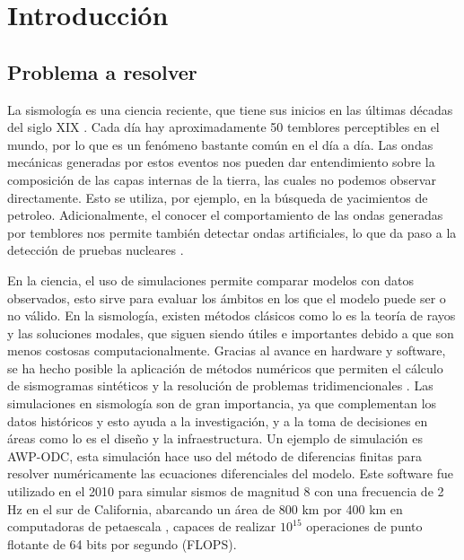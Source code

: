 \chapter{Introducción}
\section{Problema a resolver}
La sismología es una ciencia reciente, que tiene sus inicios en las últimas décadas del siglo XIX \cite[2-3]{Shearer2019}. Cada día hay aproximadamente 50 temblores perceptibles en el mundo, por lo que es un fenómeno bastante común en el día a día. Las ondas mecánicas generadas por estos eventos nos pueden dar entendimiento sobre la composición de las capas internas de la tierra, las cuales no podemos observar directamente. Esto se utiliza, por ejemplo, en la búsqueda de yacimientos de petroleo. Adicionalmente, el conocer el comportamiento de las ondas generadas por temblores nos permite también detectar ondas artificiales, lo que da paso a la detección de pruebas nucleares \cite[1, 5, 8]{Shearer2019}.

En la ciencia, el uso de simulaciones permite comparar modelos con datos observados, esto sirve para evaluar los ámbitos en los que el modelo puede ser o no válido. En la sismología, existen métodos clásicos como lo es la teoría de rayos y las soluciones modales, que siguen siendo útiles e importantes debido a que son menos costosas computacionalmente. Gracias al avance en hardware y software, se ha hecho posible la aplicación de métodos numéricos que permiten el cálculo de sismogramas sintéticos y la resolución de problemas tridimencionales \cite[1-2]{Igel2016}. Las simulaciones en sismología son de gran importancia, ya que complementan los datos históricos y esto ayuda a la investigación, y a la toma de decisiones en áreas como lo es el diseño y la infraestructura. Un ejemplo de simulación es AWP-ODC, esta simulación hace uso del método de diferencias finitas para resolver numéricamente las ecuaciones diferenciales del modelo. Este software fue utilizado en el 2010 para simular sismos de magnitud 8 con una frecuencia de 2 Hz en el sur de California, abarcando un área de 800 km por 400 km en computadoras de petaescala \cite{Cui2010}, capaces de realizar $10^{15}$ operaciones de punto flotante de 64 bits por segundo (FLOPS).

